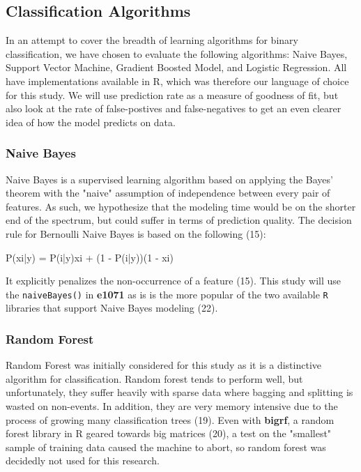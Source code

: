 \documentclass[a4paper]{article}
\begin{document}
\begin{multicols}{2}
\subsection*{Classification Algorithms}
In an attempt to cover the breadth of learning algorithms for binary classification, we have chosen to evaluate the following algorithms: Naive Bayes, Support Vector Machine, Gradient Boosted Model, and Logistic Regression. All have implementations available in R, which was therefore our language of choice for this study. We will use prediction rate as a measure of goodness of fit, but also look at the rate of false-postives and false-negatives to get an even clearer idea of how the model predicts on data.

\subsubsection*{Naive Bayes}
Naive Bayes is a supervised learning algorithm based on applying the Bayes' theorem with the "naive" assumption of independence between every pair of features. As such, we hypothesize that the modeling time would be on the shorter end of the spectrum, but could suffer in terms of prediction quality. The decision rule for Bernoulli Naive Bayes is based on the following (15):
\begin{center}
P(xi|y) = P(i|y)xi + (1 - P(i|y))(1 - xi)
\end{center}
It explicitly penalizes the non-occurrence of a feature (15). This study will use the \texttt{naiveBayes()} in \textbf{e1071} as is is the more popular of the two available \texttt{R} libraries that support Naive Bayes modeling (22).

\subsubsection*{Random Forest}
Random Forest was initially considered for this study as it is a distinctive algorithm for classification. Random forest tends to perform well, but unfortunately, they suffer heavily with sparse data where bagging and splitting is wasted on non-events. In addition, they are very memory intensive due to the process of growing many classification trees (19). Even with \textbf{bigrf}, a random forest library in R geared towards big matrices (20), a test on the "smallest" sample of training data caused the machine to abort, so random forest was decidedly not used for this research.


\end{multicols}
\end{document}
